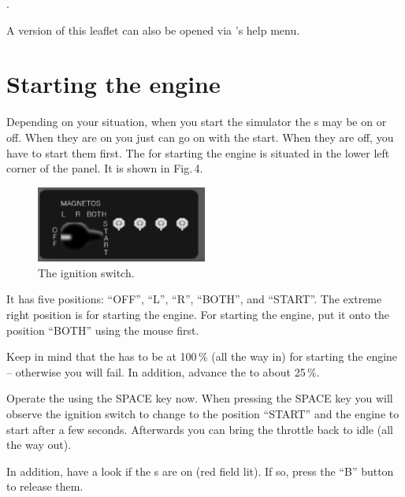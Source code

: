 .
 \medskip

\noindent
A version of this leaflet can also be opened via \FlightGear{}'s help menu.

\section{Starting the engine}

Depending on your situation, when you start the simulator the
s may be on or off. When they are on you just can go on
with the start. When they are off, you have to start them first. The
 for starting the engine is situated in the
lower left corner of the panel. It is shown in Fig.\,4.

\begin{figure}[!htp]
\centering
\includegraphics[width=0.5\textwidth]{magnet2}
\caption{The ignition switch.}
\end{figure}

It has five positions: ``OFF'', ``L'', ``R'', ``BOTH'', and ``START''. 
The extreme right position is for starting the engine. For starting the
engine, put it onto the position ``BOTH'' using the mouse first.

Keep in mind that the  has to be at 100\,\% (all
the way in) for starting the engine -- otherwise you will fail. In
addition, advance the  to about 25\,\%.

Operate the  using the SPACE key now. When pressing the
SPACE key you will observe the ignition switch to change to the
position ``START'' and the engine to start after a few seconds. 
Afterwards you can bring the throttle back to idle (all the way out).

In addition, have a look if the s are on (red
field lit). If so, press the ``B'' button to release them.

